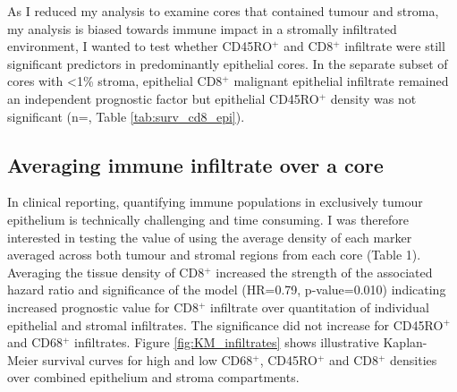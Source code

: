 As I reduced my analysis to examine cores that contained tumour and stroma, my analysis is biased towards immune impact in a stromally infiltrated environment, I wanted to test whether CD45RO$^+$ and CD8$^+$ infiltrate were still significant predictors in predominantly epithelial cores. In the separate subset of cores with <1\% stroma, epithelial CD8$^+$ malignant epithelial infiltrate remained an independent prognostic factor but epithelial CD45RO$^+$ density was not significant (n=, Table \ref{tab:surv_cd8_epi}). %

\subsection{Averaging immune infiltrate over a core}

In clinical reporting, quantifying immune populations in exclusively tumour epithelium is technically challenging and time consuming. I was therefore interested in testing the value of using the average density of each marker averaged across both tumour and stromal regions from each core (Table 1).  Averaging the tissue density of CD8$^+$ increased the strength of the associated hazard ratio and significance of the model (HR=0.79, p-value=0.010) indicating increased prognostic value for CD8$^+$ infiltrate over quantitation of individual epithelial and stromal infiltrates. The significance did not increase for CD45RO$^+$ and CD68$^+$ infiltrates.  Figure \ref{fig:KM_infiltrates} shows illustrative Kaplan-Meier survival curves for high and low CD68$^+$, CD45RO$^+$ and CD8$^+$ densities over combined epithelium and stroma compartments.\\


